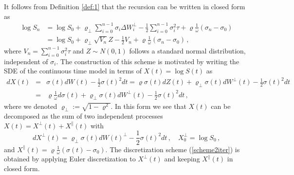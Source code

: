 \documentclass[11pt]{article}
\numberwithin{equation}{section}
\theoremstyle{plain}
\begin{document}
It follows from Definition \ref{def:1} that 
the recursion can be written in closed form as
\begin{align}\label{scheme2}
\log S_n &= \log S_0 + \varrho_\perp \sum_{i=0}^{n-1} \sigma_i \Delta W_i^\perp - \frac12 \sum_{i=0}^{n-1}
\sigma_i^2 \tau + \varrho\frac{1}{\omega} (\sigma_n - \sigma_0) \\
&= \log S_0 + \varrho_\perp \sqrt{V_n} Z - \frac12 V_n +  \varrho\frac{1}{\omega} (\sigma_n - \sigma_0)\,, \nonumber
\end{align}
where $V_n =\sum_{i=0}^{n-1}
\sigma_i^2 \tau$ and $Z\sim N(0,1)$ follows a standard normal distribution, 
independent of $\sigma_i$.
The construction of this scheme is motivated by writing the SDE of the continuous time model in
terms of  $X(t) = \log S(t)$ as
\begin{eqnarray}\label{SDE3}
dX(t) &=& \sigma(t) dW(t) - \frac12 \sigma(t)^2 dt 
= \varrho \sigma(t) dZ(t) + \varrho_\perp \sigma(t) dW^\perp(t) - 
\frac12 \sigma(t)^2 dt  \\
&=& \varrho \frac{1}{\omega} d\sigma(t) + \varrho_\perp \sigma(t) dW^\perp(t) - 
\frac12 \sigma(t)^2 dt \,, \nonumber
\end{eqnarray}
where we denoted $\varrho_\perp:= \sqrt{1-\varrho^2}$. 
In this form we see that $X(t)$ can be decomposed as the sum of two independent processes
$X(t) = X^\perp(t) + X^\parallel(t)$ with 
\begin{equation}
dX^\perp(t) = \varrho_\perp \sigma(t) dW(t)^\perp - 
\frac12 \sigma(t)^2 dt\,,\quad X^\perp_0 = \log S_0\,,
\end{equation}
and $X^\parallel(t) = \varrho \frac{1}{\omega} (\sigma(t) - \sigma_0)$. 
The discretization scheme (\ref{scheme2iter}) is obtained by applying Euler discretization to
$X^\perp(t)$ and keeping $X^\parallel(t)$ in closed form. 
\end{document}
